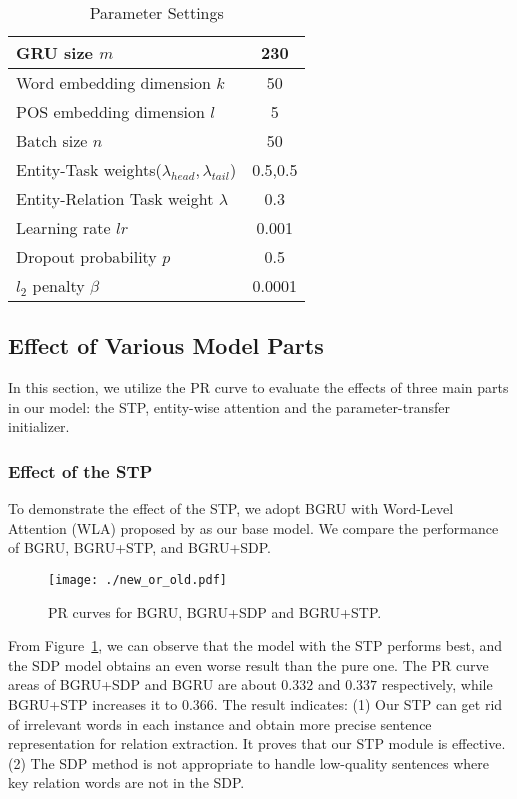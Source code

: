 \documentclass[11pt,a4paper]{article}
\begin{document}
  \begin{table}[htbp]
    \centering
    \begin{tabular}{|l|c|}
      \hline
      GRU size $m$ & 230\\
      \hline
      Word embedding dimension $k$ & 50\\
      \hline
      POS embedding dimension $l$ & 5\\
      \hline
      Batch size $n$ & 50\\
      \hline
      Entity-Task weights($\lambda_{head},\lambda_{tail}$) & 0.5,0.5\\
      \hline
      Entity-Relation Task weight $\lambda$ & 0.3\\
      \hline
      Learning rate $lr$ & 0.001\\
      \hline
      Dropout probability $p$ & 0.5\\
      \hline
      $l_2$ penalty $\beta$ & 0.0001\\
      \hline
    \end{tabular}
    \caption{Parameter Settings}
    \label{table:parameter}
  \end{table}

  \subsection{Effect of Various Model Parts}
  In this section, we utilize the PR curve to evaluate the effects of three main parts in our model: the STP, entity-wise attention and the parameter-transfer initializer.

  \subsubsection*{Effect of the STP}
  To demonstrate the effect of the STP, we adopt BGRU with Word-Level Attention (WLA) proposed by \citet{zhou2016attention} as our base model. We compare the performance of BGRU, BGRU+STP, and BGRU+SDP.

  \begin{figure}[htbp]
    \centering
    \texttt{[image: ./new\_or\_old.pdf]}
    \caption{PR curves for BGRU, BGRU+SDP and BGRU+STP.}
    \label{fig:new_or_old}
  \end{figure}

  From Figure~\ref{fig:new_or_old}, we can observe that the model with the STP performs best, and the SDP model obtains an even worse result than the pure one. The PR curve areas of BGRU+SDP and BGRU are about $0.332$ and $0.337$ respectively, while BGRU+STP increases it to $0.366$. The result indicates: (1) Our STP can get rid of irrelevant words in each instance and obtain more precise sentence representation for relation extraction. It proves that our STP module is effective. (2) The SDP method is not appropriate to handle low-quality sentences where key relation words are not in the SDP.
\end{document}
